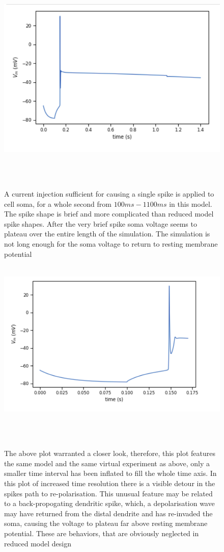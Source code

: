 \begin{figure}
  \centering
    \includegraphics[scale=0.8]{figures/correct_active_l5pc.png}
    \caption[Short duration spike in the L5PC model]{A current injection sufficient for causing a single spike is applied to cell soma, for a whole second from $100ms-1100ms$ in this model. The spike shape is brief and more complicated than reduced model spike shapes. After the very brief spike soma voltage seems to plateau over the entire length of the simulation. The simulation is not long enough for the soma voltage to return to resting membrane potential}
  \label{fig:sub1}
\end{figure}


\centering
\begin{figure}
  \centering
    \includegraphics[scale=0.8]{figures/spike_shape.png}
    \caption[Complex spike in the L5PC model]{The above plot warranted a closer look, therefore, this plot features the same model and the same virtual experiment as above, only a smaller time interval has been inflated to fill the whole time axis. In this plot of increased time resolution there is a visible detour in the spikes path to re-polarisation. This unusual feature may be related to a back-propogating dendritic spike, which, a depolarisation wave may have returned from the distal dendrite and has re-invaded the soma, causing the voltage to plateau far above resting membrane potential. These are behaviors, that are obviously neglected in reduced model design}
  \label{fig:sub1}
\end{figure}

